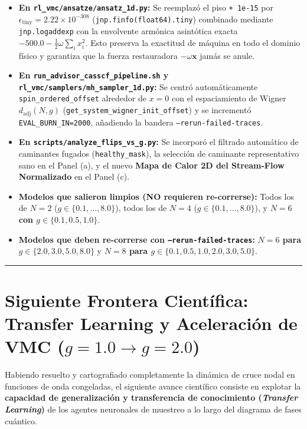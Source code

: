 \documentclass[10pt,a4paper]{article}
\begin{document}
\begin{itemize}
\item \textbf{En \texttt{rl\_vmc/ansatze/ansatz\_1d.py}:} Se reemplazó el piso \texttt{+ 1e-15} por $\epsilon_{\mathrm{tiny}} = 2.22 \times 10^{-308}$ (\texttt{jnp.finfo(float64).tiny}) combinado mediante \texttt{jnp.logaddexp} con la envolvente armónica asintótica exacta $-500.0 - \frac{1}{2}\omega \sum_i x_i^2$. Esto preserva la exactitud de máquina en todo el dominio físico y garantiza que la fuerza restauradora $-\omega\mathbf{x}$ jamás se anule.
\item \textbf{En \texttt{run\_advisor\_casscf\_pipeline.sh} y \texttt{rl\_vmc/samplers/mh\_sampler\_1d.py}:} Se centró automáticamente \texttt{spin\_ordered\_offset} alrededor de $x=0$ con el espaciamiento de Wigner $d_{\mathrm{adj}}(N, g)$ (\texttt{get\_system\_wigner\_init\_offset}) y se incrementó \texttt{EVAL\_BURN\_IN=2000}, añadiendo la bandera \texttt{--rerun-failed-traces}.
\item \textbf{En \texttt{scripts/analyze\_flips\_vs\_g.py}:} Se incorporó el filtrado automático de caminantes fugados (\texttt{healthy\_mask}), la selección de caminante representativo sano en el Panel (a), y el nuevo \textbf{Mapa de Calor 2D del Stream-Flow Normalizado} en el Panel (c).
\item \textbf{Modelos que salieron limpios (NO requieren re-correrse):} Todos los de \textbf{$N=2$} ($g \in \{0.1, \dots, 8.0\}$), todos los de \textbf{$N=4$} ($g \in \{0.1, \dots, 8.0\}$), y \textbf{$N=6$ con $g \in \{0.1, 0.5, 1.0\}$}.
\item \textbf{Modelos que deben re-correrse con \texttt{--rerun-failed-traces}:} \textbf{$N=6$ para $g \in \{2.0, 3.0, 5.0, 8.0\}$} y \textbf{$N=8$ para $g \in \{0.1, 0.5, 1.0, 2.0, 3.0, 5.0\}$}.
\end{itemize}




\vspace{0.4cm}\hrule\vspace{0.4cm}




\section{Siguiente Frontera Científica: Transfer Learning y Aceleración de VMC ($g=1.0 \to g=2.0$)}



Habiendo resuelto y cartografiado completamente la dinámica de cruce nodal en funciones de onda congeladas, el siguiente avance científico consiste en explotar la \textbf{capacidad de generalización y transferencia de conocimiento (\textit{Transfer Learning})} de los agentes neuronales de muestreo a lo largo del diagrama de fases cuántico.
\end{document}
